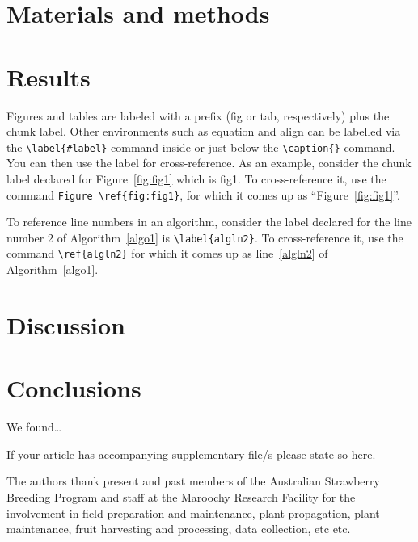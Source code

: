 \documentclass[sn-basic,pdflatex]{sn-jnl}
\theoremstyle{remark}
\theoremstyle{definition}
\begin{document}
\section{Materials and methods}\label{sec:meth}

\section{Results}\label{sec:res}

Figures and tables are labeled with a prefix (fig or tab, respectively) plus the chunk label.
Other environments such as equation and align can be labelled via the \texttt{\textbackslash{}label\{\#label\}} command inside or just below the \texttt{\textbackslash{}caption\{\}} command.
You can then use the label for cross-reference. As an example, consider
the chunk label declared for Figure~\ref{fig:fig1} which is
fig1.
To cross-reference it, use the command
\texttt{Figure\ \textbackslash{}ref\{fig:fig1\}}, for which it comes up as
``Figure~\ref{fig:fig1}''.

To reference line numbers in an algorithm, consider the label declared for the line number 2 of Algorithm~\ref{algo1} is \texttt{\textbackslash{}label\{algln2\}}. To cross-reference it, use the command \texttt{\textbackslash{}ref\{algln2\}} for which it comes up as line~\ref{algln2} of Algorithm~\ref{algo1}.

\section{Discussion}\label{sec:disc}

\section{Conclusions}\label{conclusions}

We found\ldots{}

\backmatter


If your article has accompanying supplementary file/s please state so here.


The authors thank present and past members of the Australian Strawberry Breeding Program and staff at the Maroochy Research Facility for the involvement in field preparation and maintenance, plant propagation, plant maintenance, fruit harvesting and processing, data collection, etc etc.
\end{document}
